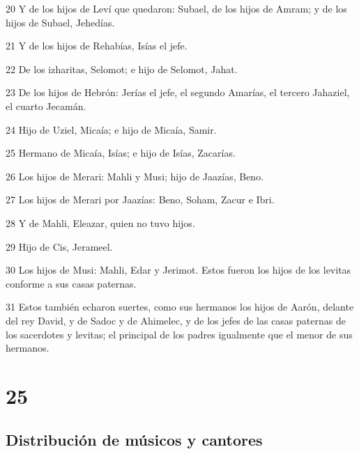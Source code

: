\par 20 Y de los hijos de Leví que quedaron: Subael, de los hijos de Amram; y de los hijos de Subael, Jehedías.
\par 21 Y de los hijos de Rehabías, Isías el jefe.
\par 22 De los izharitas, Selomot; e hijo de Selomot, Jahat.
\par 23 De los hijos de Hebrón: Jerías el jefe, el segundo Amarías, el tercero Jahaziel, el cuarto Jecamán.
\par 24 Hijo de Uziel, Micaía; e hijo de Micaía, Samir.
\par 25 Hermano de Micaía, Isías; e hijo de Isías, Zacarías.
\par 26 Los hijos de Merari: Mahli y Musi; hijo de Jaazías, Beno.
\par 27 Los hijos de Merari por Jaazías: Beno, Soham, Zacur e Ibri.
\par 28 Y de Mahli, Eleazar, quien no tuvo hijos.
\par 29 Hijo de Cis, Jerameel.
\par 30 Los hijos de Musi: Mahli, Edar y Jerimot. Estos fueron los hijos de los levitas conforme a sus casas paternas.
\par 31 Estos también echaron suertes, como sus hermanos los hijos de Aarón, delante del rey David, y de Sadoc y de Ahimelec, y de los jefes de las casas paternas de los sacerdotes y levitas; el principal de los padres igualmente que el menor de sus hermanos.

\chapter{25}

\section*{Distribución de músicos y cantores}

